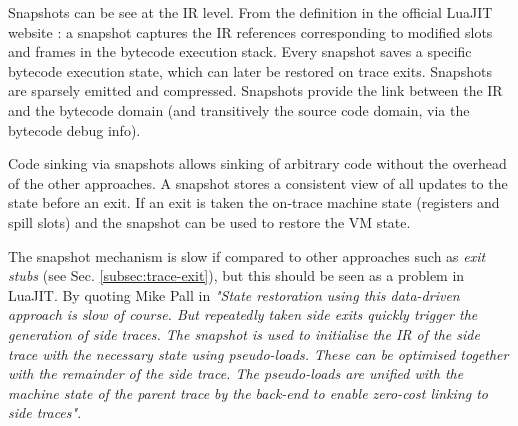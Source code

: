 Snapshots can be see at the IR level. From the definition in the official LuaJIT website \cite{luajit-ir}: a snapshot captures the IR references corresponding to modified slots and frames in the bytecode execution stack. Every snapshot saves a specific bytecode execution state, which can later be restored on trace exits. Snapshots are sparsely emitted and compressed. Snapshots provide the link between the IR and the bytecode domain (and transitively the source code domain, via the bytecode debug info).

Code sinking via snapshots allows sinking of arbitrary code without the overhead of the other approaches. A snapshot stores a consistent view of all updates to the state before an exit. If an exit is taken the on-trace machine state (registers and spill slots) and the snapshot can be used to restore the VM state.

The snapshot mechanism is slow if compared to other approaches such as \textit{exit stubs} (see Sec. \ref{subsec:trace-exit}), but this should be seen as a problem in LuaJIT. By quoting Mike Pall in \cite{luajit-mail-1} \textit{"State restoration using this data-driven approach is slow of course. But repeatedly taken side exits quickly trigger the generation of side traces. The snapshot is used to initialise the IR of the side trace with the necessary state using pseudo-loads. These can be optimised together with the remainder of the side trace. The pseudo-loads are unified with the machine state of the parent trace by the back-end to enable zero-cost linking to side traces"}.
  
